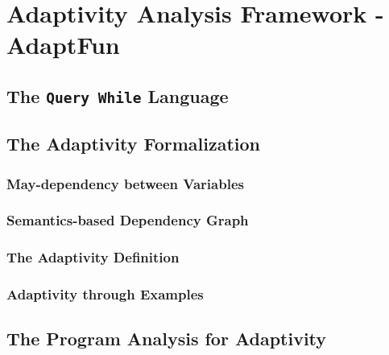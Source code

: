\documentclass[12pt, letterpaper]{report}   %
\newcommand{\THESYSTEM}{\textsf{AdaptFun}}
\begin{document}
\chapter{Adaptivity Analysis Framework - {\THESYSTEM}}
\label{sec:adapt-analysis}


\clearpage
\section{The {\tt Query While} Language}
\label{sec:adapt-language}


\clearpage
\section{The Adaptivity Formalization}
\label{sec:adapt-exe}


\subsection{May-dependency between Variables}
\label{sec:dynamic-datadep}


\subsection{Semantics-based Dependency Graph}
\label{sec:dynamic-graph}


\subsection{The Adaptivity Definition}
\label{sec:dynamic-adapt}


\subsection{Adaptivity through Examples}
\label{sec:dynamic-examples}
%


\clearpage
\section{The Program Analysis for Adaptivity}
\label{sec:adapt-static}

\end{document}
